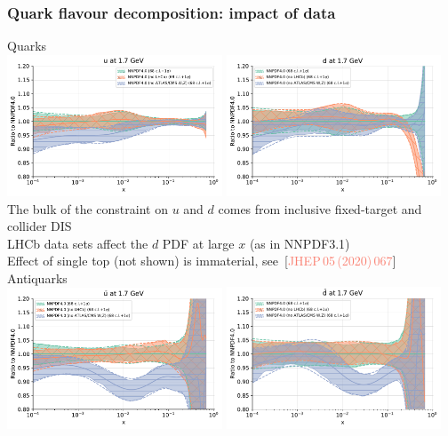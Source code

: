 \documentclass{beamer}
\begin{document}
\begin{frame}
 \frametitle{Quark flavour decomposition: impact of data}
 \footnotesize
 \begin{overlayarea}{\textwidth}{5.5cm}
  {
   \centering
   Quarks\\
   \includegraphics[width=0.48\textwidth]{plots/flavour_u}
   \includegraphics[width=0.48\textwidth]{plots/flavour_d}\\
   \vspace{0.1cm}
   The bulk of the constraint on $u$ and $d$ comes from inclusive fixed-target and collider DIS\\
   \vspace{0.1cm}
   LHCb data sets affect the $d$ PDF at large $x$ (as in NNPDF3.1)\\
   \vspace{0.1cm}
   Effect of single top (not shown) is immaterial, see~{\tiny{[{\textcolor{salmon}{JHEP\,05\,(2020)\,067}}]}}\\
  }
  {
   \centering
   Antiquarks\\
   \includegraphics[width=0.48\textwidth]{plots/flavour_baru}
   \includegraphics[width=0.48\textwidth]{plots/flavour_bard}\\
}
\end{overlayarea}
\end{frame}
\end{document}
